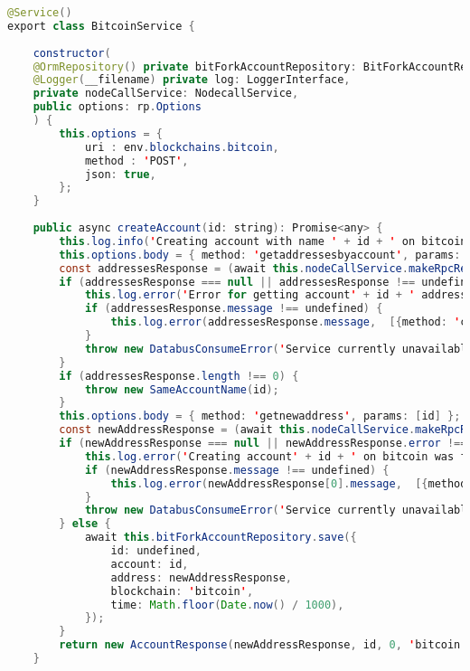 \begin{lstlisting}[language=java]
@Service()
export class BitcoinService {
	
	constructor(
	@OrmRepository() private bitForkAccountRepository: BitForkAccountRepository,
	@Logger(__filename) private log: LoggerInterface,
	private nodeCallService: NodecallService,
	public options: rp.Options
	) {
		this.options = {
			uri : env.blockchains.bitcoin,
			method : 'POST',
			json: true,
		};
	}
	
	public async createAccount(id: string): Promise<any> {
		this.log.info('Creating account with name ' + id + ' on bitcoin blockchain');
		this.options.body = { method: 'getaddressesbyaccount', params: [id] };
		const addressesResponse = (await this.nodeCallService.makeRpcRequest(this.options))[0];
		if (addressesResponse === null || addressesResponse !== undefined && addressesResponse.error !== undefined) {
			this.log.error('Error for getting account' + id + ' addresses on bitcoin', [{method: 'createAccount'}]);
			if (addressesResponse.message !== undefined) {
				this.log.error(addressesResponse.message,  [{method: 'createAccount'}]);
			}
			throw new DatabusConsumeError('Service currently unavailable');
		}
		if (addressesResponse.length !== 0) {
			throw new SameAccountName(id);
		}
		this.options.body = { method: 'getnewaddress', params: [id] };
		const newAddressResponse = (await this.nodeCallService.makeRpcRequest(this.options))[0];
		if (newAddressResponse === null || newAddressResponse.error !== undefined) {
			this.log.error('Creating account' + id + ' on bitcoin was fault', [{method: 'createAccount'}]);
			if (newAddressResponse.message !== undefined) {
				this.log.error(newAddressResponse[0].message,  [{method: 'createAccount'}]);
			}
			throw new DatabusConsumeError('Service currently unavailable');
		} else {
			await this.bitForkAccountRepository.save({
				id: undefined,
				account: id,
				address: newAddressResponse,
				blockchain: 'bitcoin',
				time: Math.floor(Date.now() / 1000),
			});
		}
		return new AccountResponse(newAddressResponse, id, 0, 'bitcoin');
	}
	

\end{lstlisting}
